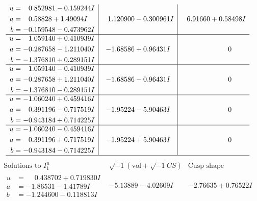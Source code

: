 \documentclass[1p]{elsarticle_modified}
\theoremstyle{definition}
\newcommand{\I}{\sqrt{-1}}
\begin{document}
$$\begin{array}{c|c|c}
\begin{aligned}
u &= \phantom{-}0.852981 - 0.159244 I \\
a &= \phantom{-}0.58828 + 1.49094 I \\
b &= -0.159548 - 0.473962 I\end{aligned}
 & \phantom{-}1.120900 - 0.300961 I & \phantom{-}6.91660 + 0.58498 I \\ \hline\begin{aligned}
u &= \phantom{-}1.059140 + 0.410939 I \\
a &= -0.287658 - 1.211040 I \\
b &= -1.376810 + 0.289151 I\end{aligned}
 & -1.68586 + 0.96431 I & \phantom{-0.000000 } 0 \\ \hline\begin{aligned}
u &= \phantom{-}1.059140 - 0.410939 I \\
a &= -0.287658 + 1.211040 I \\
b &= -1.376810 - 0.289151 I\end{aligned}
 & -1.68586 - 0.96431 I & \phantom{-0.000000 } 0 \\ \hline\begin{aligned}
u &= -1.060240 + 0.459416 I \\
a &= \phantom{-}0.391196 - 0.717519 I \\
b &= -0.943184 + 0.714225 I\end{aligned}
 & -1.95224 - 5.90463 I & \phantom{-0.000000 } 0 \\ \hline\begin{aligned}
u &= -1.060240 - 0.459416 I \\
a &= \phantom{-}0.391196 + 0.717519 I \\
b &= -0.943184 - 0.714225 I\end{aligned}
 & -1.95224 + 5.90463 I & \phantom{-0.000000 } 0\\
 \hline 
 \end{array}$$\newpage$$\begin{array}{c|c|c}  
\text{Solutions to }I^u_{1}& \I (\text{vol} + \sqrt{-1}CS) & \text{Cusp shape}\\
 \hline 
\begin{aligned}
u &= \phantom{-}0.438702 + 0.719830 I \\
a &= -1.86531 - 1.41789 I \\
b &= -1.244600 - 0.118813 I\end{aligned}
 & -5.13889 - 4.02609 I & -2.76635 + 0.76522 I \\ \hline\begin{aligned}

\end{aligned}
\end{array}$$
\end{document}
